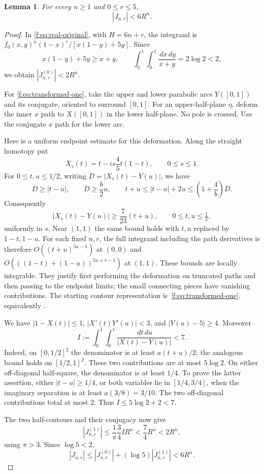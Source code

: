 \documentclass[11pt]{amsart}
\newcommand{\dd}{\,d}
\theoremstyle{plain}
\newtheorem{lemma}[theorem]{Lemma}
\theoremstyle{remark}\newtheorem{remark}[theorem]{Remark}
\numberwithin{equation}{section}
\begin{document}
\begin{lemma}\label{f:lem:integral-bound}
For every $n\geq1$ and $0\leq r\leq5$,
\[
 |J_{n,r}|<6R^n.
\]
\end{lemma}
\begin{proof}
In \eqref{f:eq:real-original}, with $H=6n+r$, the integrand is $f_0(x,y)^n(1-x)^r/[x(1-y)+5y]$. Since
\[
 x(1-y)+5y\geq x+y,\qquad
 \int_0^1\!\int_0^1\frac{\dd x\dd y}{x+y}=2\log2<2,
\]
we obtain $|J_{n,r}^{(0)}|<2R^n$.

For \eqref{f:eq:transformed-one}, take the upper and lower parabolic
arcs $Y([0,1])$ and its conjugate, oriented to surround $[0,1]$.
For an upper-half-plane $\eta$, deform the inner $x$ path to
$X([0,1])$ in the lower half-plane. No pole is crossed. Use the
conjugate $x$ path for the lower arc.

Here is a uniform endpoint estimate for this deformation. Along the
straight homotopy put
\[
 X_s(t)=t-is\frac45t(1-t),\qquad 0\le s\le1.
\]
For $0\le t,u\le1/2$, writing $D=|X_s(t)-Y(u)|$, we have
\[
 D\ge|t-u|,\qquad D\ge\frac b2u,
 \qquad t+u\le|t-u|+2u\le\left(1+\frac4b\right)D.
\]
Consequently
\begin{equation}\label{f:eq:homotopy-separation}
 |X_s(t)-Y(u)|\ge\frac7{23}(t+u),
 \qquad 0\le t,u\le\tfrac12,
\end{equation}
uniformly in $s$. Near $(1,1)$ the same bound holds with $t,u$
replaced by $1-t,1-u$. For each fixed $n,r$, the full integrand
including the path derivatives is therefore
$O((t+u)^{5n-1})$ at $(0,0)$ and
$O(((1-t)+(1-u))^{5n+r-1})$ at $(1,1)$.
These bounds are locally integrable. They justify first performing the
deformation on truncated paths and then passing to the endpoint limits;
the small connecting pieces have vanishing contributions. The starting
contour representation is~\eqref{f:eq:transformed-one}, equivalently
\cite[(2.11)]{VZ18}.

We have $|1-X(t)|\leq1$, $|X'(t)Y'(u)|<3$, and $|Y(u)-5|\geq4$. Moreover
\[
 I:=\int_0^1\!\int_0^1\frac{\dd t\dd u}{|X(t)-Y(u)|}<7.
\]
Indeed, on $[0,1/2]^2$ the denominator is at least $a(t+u)/2$; the analogous bound holds on $[1/2,1]^2$. These two contributions are at most $5\log2$. On either off-diagonal half-square, the denominator is at least $1/4$. To prove the latter assertion, either $|t-u|\geq1/4$, or both variables lie in $[1/4,3/4]$, when the imaginary separation is at least $a(3/8)=3/10$. The two off-diagonal contributions total at most $2$. Thus $I\leq5\log2+2<7$.

The two half-contours and their conjugacy now give
\[
 |J_{n,r}^{(1)}|\leq\frac{1}{\pi}\frac34 I R^n
 <\frac74R^n<2R^n,
\]
using $\pi>3$. Since $\log5<2$,
\[
 |J_{n,r}|\leq |J_{n,r}^{(0)}|+(\log5)|J_{n,r}^{(1)}|<6R^n.
\]
\end{proof}
\end{document}
